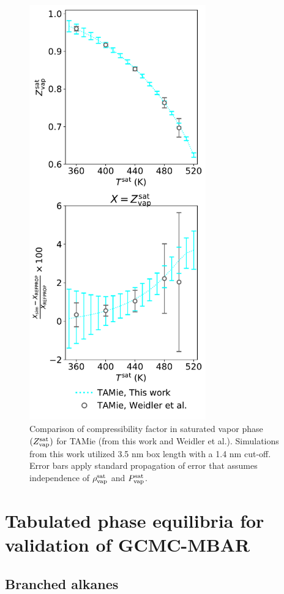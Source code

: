 \documentclass[journal=jctc,manuscript=article]{achemso}
\begin{document}
\begin{figure}[htb!]
	\centering
	\includegraphics[width=3.0in]{Compressibility_factor_CYC6_MiPPE_TAMie.pdf}
	\caption{Comparison of compressibility factor in saturated vapor phase $(Z^{\rm sat}_{\rm vap})$ for TAMie (from this work and Weidler et al.). Simulations from this work utilized 3.5 nm box length with a 1.4 nm cut-off. Error bars apply standard propagation of error that assumes independence of $\rho_{\rm vap}^{\rm sat}$ and $P_{\rm vap}^{\rm sat}$.}
	\label{SI fig:Z_CYC6_TAMie}
\end{figure}

\newpage
\clearpage

\section{Tabulated phase equilibria for validation of GCMC-MBAR} \label{SI sec: Tabulated MBAR results}

\subsection{Branched alkanes}
\end{document}
